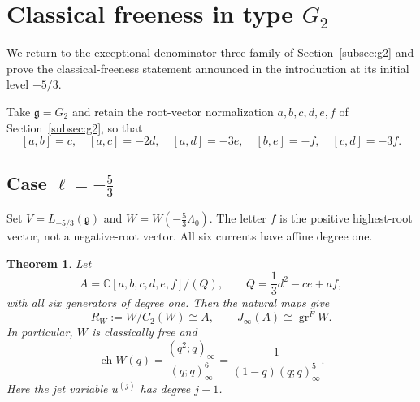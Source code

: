 \documentclass[11pt]{amsart}
\newtheorem{theorem}{Theorem}[section]
\newtheorem{corollary}[theorem]{Corollary}
\theoremstyle{definition}
\theoremstyle{remark}
\newcommand{\C}{\mathbb C}
\newcommand{\g}{\mathfrak g}
\newcommand{\vac}{\mathbf1}
\newcommand{\J}{J_\infty}
\DeclareMathOperator{\gr}{gr}
\DeclareMathOperator{\ch}{ch}
\begin{document}

\section{Classical freeness in type \texorpdfstring{$G_2$}{G2}}\label{sec:g2-classical}

We return to the exceptional denominator-three family of
Section~\ref{subsec:g2} and prove the classical-freeness statement
announced in the introduction at its initial level $-5/3$.

Take $\g=G_2$ and retain the root-vector normalization
$a,b,c,d,e,f$ of Section~\ref{subsec:g2}, so that
\begin{equation}\label{eq:g2-case-brackets}
 [a,b]=c,\quad [a,c]=-2d,\quad [a,d]=-3e,\quad
 [b,e]=-f,\quad[c,d]=-3f.
\end{equation}

\subsection{ Case $\ell=-\frac{5}{3}$}
Set $V=L_{-5/3}(\g)$ and $W=W(-\frac53\Lambda_0)$.
The letter $f$ is the positive highest-root vector, not a negative-root
vector. All six currents have affine degree one.

\begin{theorem}\label{thm:g2-case-main}
Let
\[
 A=\C[a,b,c,d,e,f]/(Q),\qquad Q=\frac13d^2-ce+af,
\]
with all six generators of degree one. Then the natural maps give
\[
 R_W:=W/C_2(W)\cong A,
 \qquad J_\infty(A)\cong\gr^FW.
\]
In particular, $W$ is classically free and
\begin{equation}\label{eq:g2-case-character}
 \ch W(q)=\frac{(q^2;q)_\infty}{(q;q)_\infty^6}
 =\frac{1}{(1-q)(q;q)_\infty^5}.
\end{equation}
Here the jet variable $u^{(j)}$ has degree $j+1$.
\end{theorem}
\end{document}
